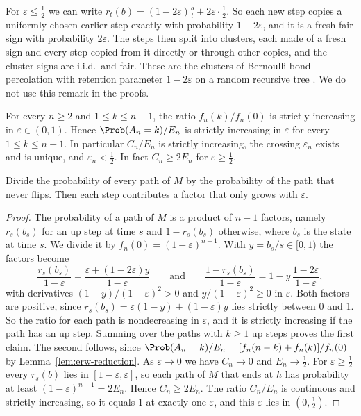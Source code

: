 \begin{remark}\label{rem:families}
For $\varepsilon\le\frac12$ we can write
$r_t(b)=(1-2\varepsilon)\frac bt+2\varepsilon\cdot\frac12$. So each new
step copies a uniformly chosen earlier step exactly with probability
$1-2\varepsilon$, and it is a fresh fair sign with probability
$2\varepsilon$. The steps then split into clusters, each made of a fresh
sign and every step copied from it directly or through other copies, and
the cluster signs are i.i.d.\ and fair. These are the clusters of
Bernoulli bond percolation with retention parameter $1-2\varepsilon$ on a
random recursive tree \cite{kursten2016}. We do not use this remark in the
proofs.
\end{remark}

\begin{proposition}\label{prop:mlr}
For every $n\ge2$ and $1\le k\le n-1$, the ratio $f_n(k)/f_n(0)$ is
strictly increasing in $\varepsilon\in(0,1)$. Hence $\Prob(A_n=k)/E_n$ is
strictly increasing in $\varepsilon$ for every $1\le k\le n-1$. In
particular $C_n/E_n$ is strictly increasing, the crossing $\varepsilon_n$
exists and is unique, and $\varepsilon_n<\frac12$. In fact $C_n\ge2E_n$ for
$\varepsilon\ge\frac12$.
\end{proposition}

Divide the probability of every path of $M$ by the probability of the path
that never flips. Then each step contributes a factor that only grows with
$\varepsilon$.

\begin{proof}
The probability of a path of $M$ is a product of $n-1$ factors, namely
$r_s(b_s)$ for an up step at time $s$ and $1-r_s(b_s)$ otherwise, where
$b_s$ is the state at time $s$. We divide it by
$f_n(0)=(1-\varepsilon)^{n-1}$. With $y=b_s/s\in[0,1)$ the factors
become
\[
 \frac{r_s(b_s)}{1-\varepsilon}=\frac{\varepsilon+(1-2\varepsilon)y}{1-\varepsilon}
 \qquad\text{and}\qquad
 \frac{1-r_s(b_s)}{1-\varepsilon}=1-y\,\frac{1-2\varepsilon}{1-\varepsilon},
\]
with derivatives $(1-y)/(1-\varepsilon)^2>0$ and
$y/(1-\varepsilon)^2\ge0$ in $\varepsilon$. Both factors are positive, since
$r_s(b_s)=\varepsilon(1-y)+(1-\varepsilon)y$ lies strictly between 0
and 1. So the ratio for each path is nondecreasing in $\varepsilon$, and it
is strictly increasing if the path has an up step. Summing over the paths
with $k\ge1$ up steps proves the first claim. The second follows, since
$\Prob(A_n=k)/E_n=[f_n(n-k)+f_n(k)]/f_n(0)$ by
Lemma~\ref{lem:erw-reduction}. As $\varepsilon\to0$ we have $C_n\to0$ and
$E_n\to\frac12$. For $\varepsilon\ge\frac12$ every $r_s(b)$ lies in
$[1-\varepsilon,\varepsilon]$, so each path of $M$ that ends at $h$ has
probability at least $(1-\varepsilon)^{n-1}=2E_n$. Hence $C_n\ge2E_n$. The
ratio $C_n/E_n$ is continuous and strictly increasing, so it equals 1 at
exactly one $\varepsilon$, and this $\varepsilon$ lies in $(0,\frac12)$.
\end{proof}

